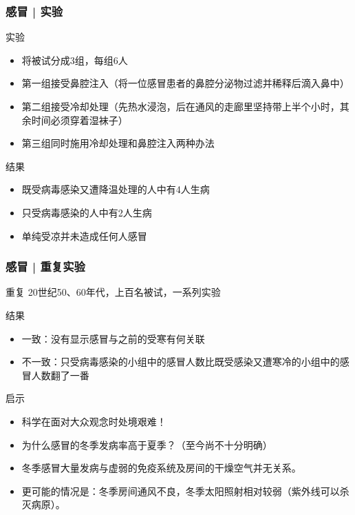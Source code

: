 \begin{frame}
  \frametitle{感冒 | 实验}
  \begin{block}{实验}
    \begin{itemize}
      \item 将被试分成3组，每组6人
      \item 第一组接受鼻腔注入（将一位感冒患者的鼻腔分泌物过滤并稀释后滴入鼻中）
      \item 第二组接受冷却处理（先热水浸泡，后在通风的走廊里坚持带上半个小时，其余时间必须穿着湿袜子）
      \item 第三组同时施用冷却处理和鼻腔注入两种办法
    \end{itemize}
  \end{block}
  \pause
  \begin{block}{结果}
    \begin{itemize}
      \item 既受病毒感染又遭降温处理的人中有4人生病
      \item 只受病毒感染的人中有2人生病
      \item 单纯受凉并未造成任何人感冒
    \end{itemize}
  \end{block}
\end{frame}

\begin{frame}
  \frametitle{感冒 | 重复实验}
  \begin{block}{重复}
      20世纪50、60年代，上百名被试，一系列实验
  \end{block}
  \pause
  \begin{block}{结果}
    \begin{itemize}
      \item 一致：没有显示感冒与之前的受寒有何关联
      \item 不一致：只受病毒感染的小组中的感冒人数比既受感染又遭寒冷的小组中的感冒人数翻了一番
    \end{itemize}
  \end{block}
  \pause
  \begin{block}{启示}
    \begin{itemize}
      \item 科学在面对大众观念时处境艰难！
      \item 为什么感冒的冬季发病率高于夏季？（至今尚不十分明确）
      \item 冬季感冒大量发病与虚弱的免疫系统及房间的干燥空气并无关系。
      \item 更可能的情况是：冬季房间通风不良，冬季太阳照射相对较弱（紫外线可以杀灭病原）。
    \end{itemize}
  \end{block}
\end{frame}

